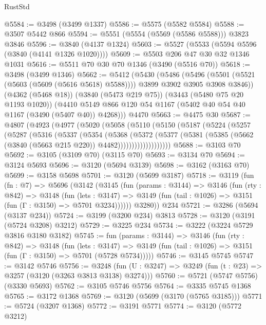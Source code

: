 \begin{lexlean}{RustStd}
\begin{coremodule}
{\begin{coremodule}
{{{{{{{{{{{{{{{{{{{{{{{{{{@5584 := @3498 (@3499 @1337)
@5586 := @5575 (@5582 @5584)
@5588 := @3507 @5442 @866
@5594 := @5551 (@5554 (@5569 (@5586 @5588))) @3823 @3846
@5596 := @3840 (@4137 @1324)
@5603 := @5527 (@5533 (@5594 @5596 (@3840 (@4141 @1326 @1020))))
@5609 := @5503 @206 @47 @30 @32 @1346 @1031
@5616 := @5511 @70 @30 @70 @1346 (@3490 (@5516 @70))
@5618 := @3498 (@3499 @1346)
@5662 := @5412
    (@5430
      (@5486
        (@5496 (@5501 (@5521 (@5603 (@5609 (@5616 @5618) @5588)))) @3899 @3902 @3905 @3908 @3846))
      (@4362 (@5468 @18))
      (@3840 (@5473 @219 @75))
      (@3443 (@5480 @75 @20 @1193 @1020))
      (@4410 @5149 @866 @120 @54 @1167 (@5402 @40 @54 @40 @1167 (@3490 (@5407 @40)) @4268)))
    @4470
@5663 := @4475 @30
@5687 := @4807
    (@4923
      (@4977
        (@5020
          (@5058
            (@5110
              (@5150
                (@5187
                  (@5224
                    (@5257
                      (@5287
                        (@5316
                          (@5337
                            (@5354
                              (@5368
                                (@5372
                                  (@5377
                                    (@5381
                                      (@5385
                                        (@5662 (@3840 (@5663 @215 @220)) @4482)))))))))))))))))))
@5688 := @3103 @70
@5692 := @3105 (@3109 @70) (@3115 @70)
@5693 := @3134 @70
@5694 := @3124 @5693
@5696 := @3120 (@5694 @3139)
@5698 := @3162 (@3163 @70)
@5699 := @3158 @5698
@5701 := @3120 (@5699 @3187)
@5718 := @3119
    (fun (fn : @7) =>
    @5696
      (@3142
        (@3145
          (fun (params : @3144) =>
          @3146
            (fun (rty : @842) =>
            @3148
              (fun (lets : @3147) =>
              @3149 (fun (tail : @1026) => @3151 (fun (Γ : @3150) => @5701 @3234))))))
        @3280))
    @234
@5721 := @3286 (@5694 (@3137 @234))
@5724 := @3199 (@3200 @234) @3813
@5728 := @3120 (@3191 (@5724 @3208) @3212)
@5729 := @3225 @234
@5734 := @3222 (@3224 @5729 @3816 @3180 @3182)
@5745 := fun (params : @3144) =>
  @3146
    (fun (rty : @842) =>
    @3148
      (fun (lets : @3147) =>
      @3149 (fun (tail : @1026) => @3151 (fun (Γ : @3150) => @5701 (@5728 @5734)))))
@5746 := @3145 @5745
@5747 := @3142 @5746
@5756 := @3248 (fun (U : @3247) => @3249 (fun (t : @23) => @3257 (@3120 (@3263 @3813 @3138) @3274)))
@5760 := @5721 (@5747 @5756) (@3330 @5693)
@5762 := @3105 @5746 @5756
@5764 := @3335 @5745 @1368
@5765 := @3172 @1368
@5769 := @3120 (@5699 (@3170 (@5765 @3185)))
@5771 := @5724 (@3207 @1368)
@5772 := @3191 @5771
@5774 := @3120 (@5772 @3212)
}}}}}}}}}}}}}}}}}}}}}}}}}}
\end{coremodule}}
\end{coremodule}
\end{lexlean}
